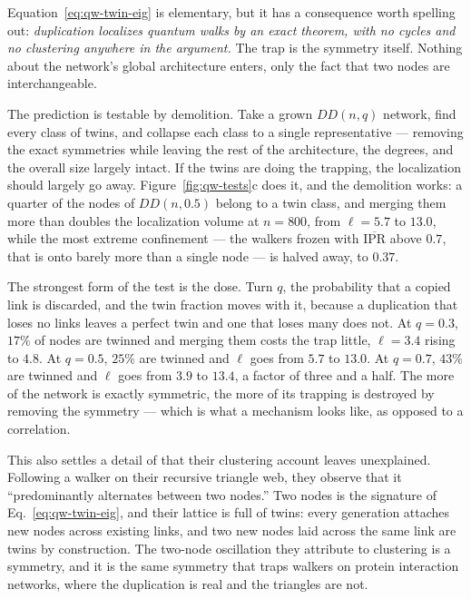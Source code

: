 Equation~\eqref{eq:qw-twin-eig} is elementary, but it has a consequence worth
spelling out: \emph{duplication localizes quantum walks by an exact theorem, with no
cycles and no clustering anywhere in the argument.} The trap is the symmetry itself.
Nothing about the network's global architecture enters, only the fact that two nodes
are interchangeable.

The prediction is testable by demolition. Take a grown $DD(n,q)$ network, find every
class of twins, and collapse each class to a single representative --- removing the
exact symmetries while leaving the rest of the architecture, the degrees, and the
overall size largely intact. If the twins are doing the trapping, the localization
should largely go away. Figure~\ref{fig:qw-tests}c does it, and the demolition works:
a quarter of the nodes of $DD(n,0.5)$ belong to a twin class, and merging them more
than doubles the localization volume at $n=800$, from $\ell=5.7$ to $13.0$, while the
most extreme confinement --- the walkers frozen with $\overline{\mathrm{IPR}}$ above
$0.7$, that is onto barely more than a single node --- is halved away, to $0.37$.

The strongest form of the test is the dose. Turn $q$, the probability that a copied
link is discarded, and the twin fraction moves with it, because a duplication that
loses no links leaves a perfect twin and one that loses many does not. At $q=0.3$,
$17\%$ of nodes are twinned and merging them costs the trap little, $\ell=3.4$ rising
to $4.8$. At $q=0.5$, $25\%$ are twinned and $\ell$ goes from $5.7$ to $13.0$. At
$q=0.7$, $43\%$ are twinned and $\ell$ goes from $3.9$ to $13.4$, a factor of three
and a half. The more of the network is exactly symmetric, the more of its trapping is
destroyed by removing the symmetry --- which is what a mechanism looks like, as
opposed to a correlation.

This also settles a detail of \citet{boettcher2025localization} that their
clustering account leaves unexplained. Following a walker on their recursive
triangle web, they observe that it ``predominantly alternates between two nodes.''
Two nodes is the signature of Eq.~\eqref{eq:qw-twin-eig}, and their lattice is full
of twins: every generation attaches new nodes across existing links, and two new
nodes laid across the same link are twins by construction. The two-node oscillation
they attribute to clustering is a symmetry, and it is the same symmetry that traps
walkers on protein interaction networks, where the duplication is real and the
triangles are not.

